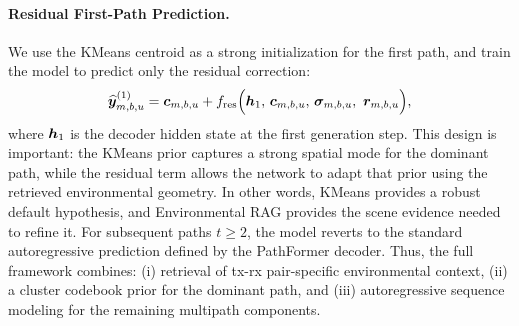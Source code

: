 \paragraph{Residual First-Path Prediction.}
We use the KMeans centroid as a strong initialization for the first path, and train the model to predict only the residual correction:
\begin{equation}
\widehat{\boldsymbol{y}}^{(1)}_{m,b,u}
=
\boldsymbol{c}_{m,b,u}
+
f_{\mathrm{res}}
\Big(
\boldsymbol{h}_1,\,
\boldsymbol{c}_{m,b,u},\,
\boldsymbol{\sigma}_{m,b,u},\
\boldsymbol{r}_{m,b,u}
\Big),
\label{eq:first_path_residual}
\end{equation}
where $\boldsymbol{h}_1$ is the decoder hidden state at the first generation step. This design is important: the KMeans prior captures a strong spatial mode for the dominant path, while the residual term allows the network to adapt that prior using the retrieved environmental geometry. In other words, KMeans provides a robust default hypothesis, and Environmental RAG provides the scene evidence needed to refine it. For subsequent paths $t\geq 2$, the model reverts to the standard autoregressive prediction defined by the PathFormer decoder. Thus, the full framework combines:
(i) retrieval of tx-rx pair-specific environmental context,
(ii) a cluster codebook prior for the dominant path, and
(iii) autoregressive sequence modeling for the remaining multipath components.



